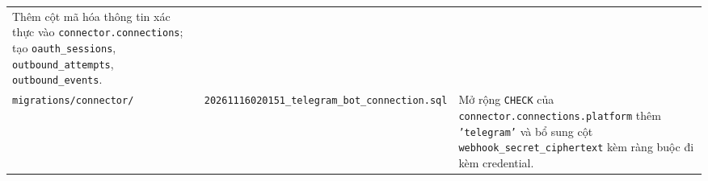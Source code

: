 \begin{table}[htbp]
\begin{tabularx}{\linewidth}{@{}
    >{\raggedright\arraybackslash}p{3.6cm}
    >{\raggedright\arraybackslash}p{5.5cm}
    >{\raggedright\arraybackslash}X@{}}
    Thêm cột mã hóa thông tin xác thực vào \texttt{connector.connections}; tạo \texttt{oauth\_sessions}, \texttt{outbound\_attempts}, \texttt{outbound\_events}. \\
    \texttt{migrations/\hspace{0pt}connector/} &
    \texttt{20261116020151\_\hspace{0pt}telegram\_bot\_\hspace{0pt}connection.sql} &
    Mở rộng \texttt{CHECK} của \texttt{connector.\hspace{0pt}connections.\hspace{0pt}platform} thêm \texttt{'telegram'} và bổ sung cột \texttt{webhook\_\hspace{0pt}secret\_\hspace{0pt}ciphertext} kèm ràng buộc đi kèm credential. \\
    \bottomrule
  \end{tabularx}
\end{table}

